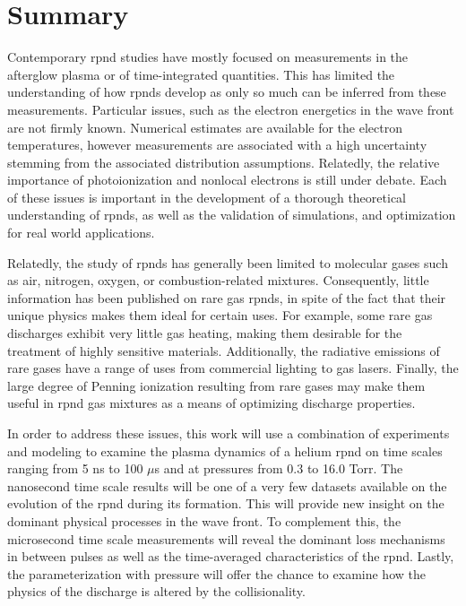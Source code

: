 \section{Summary}

Contemporary \acs{rpnd} studies have mostly focused on measurements in the
afterglow plasma or of time-integrated quantities. This has limited the
understanding of how \acs{rpnd}s develop as only so much can be inferred from
these measurements. Particular issues, such as the electron energetics in the
wave front are not firmly known. Numerical estimates are available for the
electron temperatures, however measurements are associated with a high
uncertainty stemming from the associated distribution assumptions. Relatedly,
the relative importance of photoionization and nonlocal electrons is still under
debate. Each of these issues is important in the development of a thorough
theoretical understanding of \acs{rpnd}s, as well as the validation of
simulations, and optimization for real world applications.

Relatedly, the study of \acs{rpnd}s has generally been limited to molecular
gases such as air, nitrogen, oxygen, or combustion-related mixtures.
Consequently, little information has been published on rare gas \acs{rpnd}s, in
spite of the fact that their unique physics makes them ideal for certain uses.
For example, some rare gas discharges exhibit very little gas heating, making
them desirable for the treatment of highly sensitive materials. Additionally,
the radiative emissions of rare gases have a range of uses from commercial
lighting to gas lasers. Finally, the large degree of Penning ionization
resulting from rare gases may make them useful in \acs{rpnd} gas mixtures as a
means of optimizing discharge properties.

In order to address these issues, this work will use a combination of
experiments and modeling to examine the plasma dynamics of a helium \acs{rpnd}
on time scales ranging from 5 ns to 100 $\mu$s and at pressures from 0.3 to 16.0
Torr. The nanosecond time scale results will be one of a very few datasets
available on the evolution of the \acs{rpnd} during its formation. This will
provide new insight on the dominant physical processes in the wave front. To
complement this, the microsecond time scale measurements will reveal the
dominant loss mechanisms in between pulses as well as the time-averaged
characteristics of the \acs{rpnd}. Lastly, the parameterization with pressure
will offer the chance to examine how the physics of the discharge is altered by
the collisionality.


